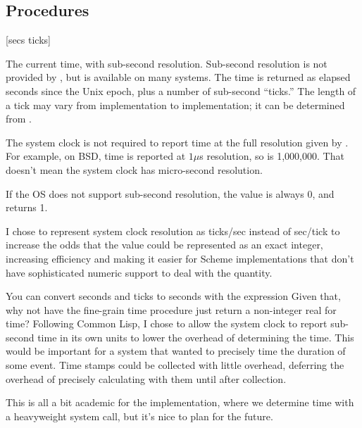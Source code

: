 \subsection{Procedures}
 {} {[secs ticks]}
  {} \real
\begin{desc}
    The current time, with sub-second resolution.
    Sub-second resolution is not provided by {\Posix},
    but is available on many systems.
    The time is returned as elapsed seconds since the Unix epoch, plus
    a number of sub-second ``ticks.''
    The length of a tick may vary from implementation to implementation;
    it can be determined from .

    The system clock is not required to report time at the full resolution
    given by . For example, on BSD, time is reported at
    $1\mu$s resolution, so  is 1,000,000. That doesn't mean
    the system clock has micro-second resolution.

    If the OS does not support sub-second resolution, the  value
    is always 0, and  returns 1.

    \begin{remarkenv}
        I chose to represent system clock resolution as ticks/sec
        instead of sec/tick to increase the odds that the value could
        be represented as an exact integer, increasing efficiency and
        making it easier for Scheme implementations that don't have
        sophisticated numeric support to deal with the quantity.

        You can convert seconds and ticks to seconds with the expression
        Given that, why not have the fine-grain time procedure just
        return a non-integer real for time? Following Common Lisp, I chose to
        allow the system clock to report sub-second time in its own units to
        lower the overhead of determining the time.  This would be important
        for a system that wanted to precisely time the duration of some
        event. Time stamps could be collected with little overhead, deferring
        the overhead of precisely calculating with them until after collection.
        
        This is all a bit academic for the {\scm} implementation, where
        we determine time with a heavyweight system call, but it's nice
        to plan for the future.
    \end{remarkenv}
\end{desc}

